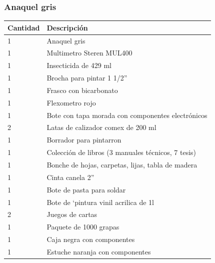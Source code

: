 \documentclass[a4paper,11pt]{article}                 %
\begin{document}
  \subsubsection*{Anaquel gris}
    \begin{longtable}{|p{}|p{}|}
    \hline
    Cantidad & Descripción                                        \\ \hline
    1        & Anaquel gris                                       \\ \hline
    1        & Multimetro Steren MUL400                           \\ \hline
    1        & Insecticida de 429 ml                              \\ \hline
    1        & Brocha para pintar 1 1/2”                          \\ \hline
    1        & Frasco con bicarbonato                             \\ \hline
    1        & Flexometro rojo                                    \\ \hline
    1        & Bote con tapa morada con componentes electrónicos  \\ \hline
    2        & Latas de calizador comex de 200 ml                 \\ \hline
    1        & Borrador para pintarron                            \\ \hline
    1        & Colección de libros (3 manuales técnicos, 7 tesis) \\ \hline
    1        & Bonche de hojas, carpetas, lijas, tabla de madera  \\ \hline
    1        & Cinta canela 2”                                    \\ \hline
    1        & Bote de pasta para soldar                          \\ \hline
    1        & Bote de `pintura vinil acrilica de 1l              \\ \hline
    2        & Juegos de cartas                                   \\ \hline
    1        & Paquete de 1000 grapas                             \\ \hline
    1        & Caja negra con componentes                         \\ \hline
    1        & Estuche naranja con componentes                    \\ \hline

\end{longtable}
\end{document}

